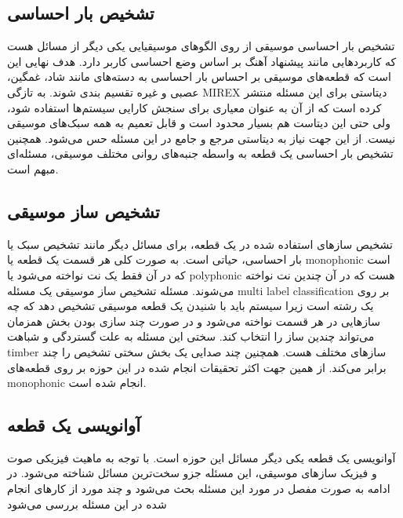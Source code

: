 \subsection{تشخیص بار احساسی}
تشخیص بار احساسی موسیقی از روی الگوهای موسیقیایی یکی دیگر از مسائل هست که
کاربردهایی مانند پیشنهاد آهنگ بر اساس وضع احساسی کاربر دارد. هدف نهایی این است
که قطعه‌های موسیقی بر احساس بار احساسی به دسته‌های مانند شاد، غمگین، عصبی و غیره
تقسیم بندی شوند. به تازگی MIREX دیتاستی برای این مسئله منتشر کرده است که از آن
به عنوان معیاری برای سنجش کارایی سیستم‌ها استفاده شود، ولی حتی این دیتاست هم
بسیار محدود است و قابل تعمیم به همه سبک‌های موسیقی نیست. از این جهت نیاز به
دیتاستی مرجع و جامع در این مسئله حس می‌شود. همچنین تشخیص بار احساسی یک قطعه به
واسطه جنبه‌های روانی مختلف موسیقی، مسئله‌ای مبهم است.

\subsection{تشخیص ساز موسیقی}
تشخیص سازهای استفاده شده در یک قطعه، برای مسائل دیگر مانند تشخیص سبک یا بار
احساسی، حیاتی است. به صورت کلی هر قسمت یک قطعه یا \gls{monophonic} است که در آن
فقط یک نت نواخته می‌شود یا \gls{polyphonic} هست که در آن چندین نت نواخته
می‌شوند. مسئله تشخیص ساز موسیقی یک مسئله \gls{multi label classification} بر روی
یک رشته است زیرا سیستم باید با شنیدن یک قطعه موسیقی تشخیص دهد که چه سازهایی در
هر قسمت نواخته می‌شود و در صورت چند سازی بودن بخش همزمان می‌تواند چندین ساز را
انتخاب کند. سختی این مسئله به علت گستردگی و شباهت \gls{timber} سازهای مختلف هست.
همچنین چند صدایی یک بخش سختی تشخیص را چند برابر می‌کند. از همین جهت اکثر تحقیقات
انجام شده در این حوزه بر روی قطعه‌های \gls{monophonic} انجام شده است.

\subsection{آوانویسی یک قطعه}
آوانویسی یک قطعه یکی دیگر مسائل این حوزه است. با توجه به ماهیت فیزیکی صوت و
فیزیک سازهای موسیقی، این مسئله جزو سخت‌ترین مسائل شناخته می‌شود. در ادامه به
صورت مفصل در مورد این مسئله بحث می‌شود و چند مورد از کارهای انجام شده در این
مسئله بررسی می‌شود

